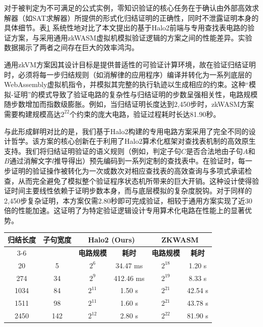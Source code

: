 对于被判定为不可满足的公式实例，零知识验证的核心任务在于确认由外部高效求解器（如SAT求解器）所提供的形式化归结证明的正确性，同时不泄露证明本身的具体细节。表\ref{tab:unsat-comparison} 系统性地对比了本文提出的基于Halo2前端与专用查找表电路的验证方案，与采用通用zkWASM虚拟机模拟验证逻辑的方案之间的性能差异。实验数据揭示了两者之间存在巨大的效率鸿沟。

通用zkVM方案因其设计目标是提供普适性的可验证计算环境，故在验证归结证明时，必须将每一步归结规则（如消解律的应用程序）编译并转化为一系列底层的WebAssembly虚拟机指令，并模拟其完整的执行轨迹以生成相应的约束。这种“模拟-证明”的模式导致了验证电路的复杂性与归结证明的步数呈强相关性，电路规模随步数增加而指数级膨胀。例如，当归结证明长度达到2,450步时，zkWASM方案需要构建规模高达$2^{22}$个约束的庞大电路，验证过程耗时长达81.90秒。

与此形成鲜明对比的是，我们基于Halo2构建的专用电路方案采用了完全不同的设计哲学。该方案的核心创新在于利用了Halo2算术化框架对查找表机制的高效原生支持。我们将归结证明验证的语义规则（例如，判定子句$C$是否合法地由子句$A$和$B$通过消解文字$l$推导得出）预先编码到一系列定制的查找表中。在验证时，每一步证明的验证操作被转化为一次或数次对相应查找表的高效查询与多项式承诺检查，从而完全避免了模拟整个验证程序状态机所带来的巨大开销。这种设计使得验证时间主要线性依赖于证明步数本身，而与底层模拟的复杂度脱钩。对于同样的2,450步复杂证明，本方案仅需2.80秒即可完成验证，相较于通用方案实现了近30倍的性能加速。这证明了为特定验证逻辑设计专用算术化电路在性能上的显著优势。

\begin{table}[htbp]
\centering
{}
\label{tab:unsat-comparison}
\begin{tabular}{cccccc}
\toprule
\multirow{2}{*}{\textbf{归结长度}} & \multirow{2}{*}{\textbf{子句宽度}} & \multicolumn{2}{c}{\textbf{Halo2 (Ours)}} & \multicolumn{2}{c}{\textbf{ZKWASM}} \\
\cline{3-6}
 & & \textbf{电路规模} & \textbf{耗时} & \textbf{电路规模} & \textbf{耗时} \\
\midrule
20 & 5 & $2^6$ & 34.47 ms & $2^{18}$ & 1.20 s \\
274 & 34 & $2^9$ & 412.46 ms & $2^{19}$ & 8.33 s \\
1034 & 84 & $2^{11}$ & 1.50 s & $2^{21}$ & 42.54 s \\
1511 & 98 & $2^{11}$ & 1.60 s & $2^{21}$ & 43.78 s \\
2450 & 142 & $2^{12}$ & 2.80 s & $2^{22}$ & 81.90 s \\
\bottomrule
\end{tabular}
\end{table}

